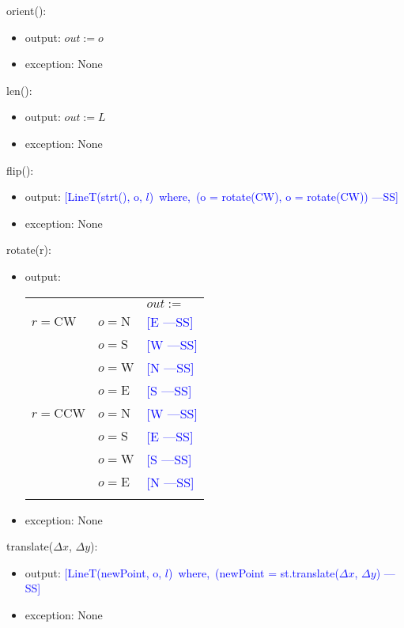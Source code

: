\documentclass[12pt]{article}
\newcommand{\authornote}[3]{\textcolor{#1}{[#3 ---#2]}}
\newcommand{\authornote}[3]{}
\newcommand{\wss}[1]{\authornote{blue}{SS}{#1}}
\begin{document}
\noindent orient():
\begin{itemize}
\item output: $out := o$
\item exception: None
\end{itemize}

\noindent len():
\begin{itemize}
\item output: $out := L$
\item exception: None
\end{itemize}

\noindent flip():
\begin{itemize}
\item output: \wss{LineT(strt(), o, $l$)\, where,\, (o = rotate(CW), o = rotate(CW))}
\item exception: None
\end{itemize}

\noindent rotate(r):
\begin{itemize}
\item output: 
\begin{tabular}{|p{}|p{2.3cm}|l|}
\hhline{~|~|-|}
\multicolumn{1}{r}{} & \multicolumn{1}{r|}{} & \multicolumn{1}{l|}{$out :=$}\\
\hhline{|-|-|-|}
$r = \mbox{CW}$ & $o = \mbox{N}$ & \wss{E}\\
\hhline{|~|-|-|}
~ & $o = \mbox{S}$ & \wss{W}\\
\hhline{|~|-|-|}
~ & $o = \mbox{W}$ & \wss{N}\\
\hhline{|~|-|-|}
~ & $o = \mbox{E}$ & \wss{S}\\
\hhline{-|-|-|}
$r = \mbox{CCW}$ & $o = \mbox{N}$ & \wss{W}\\
\hhline{|~|-|-|}
~ & $o = \mbox{S}$ & \wss{E}\\
\hhline{|~|-|-|}
~ & $o = \mbox{W}$ & \wss{S}\\
\hhline{|~|-|-|}
~ & $o = \mbox{E}$ & \wss{N}\\
\hhline{-|-|-|}
\end{tabular}

\item exception: None
\end{itemize}

\noindent translate($\Delta x$, $\Delta y$):
\begin{itemize}
\item output: \wss{LineT(newPoint, o, $l$)\, where,\, (newPoint = st.translate($\Delta x$, $\Delta y$)}
\item exception: None
\end{itemize}
\end{document}
